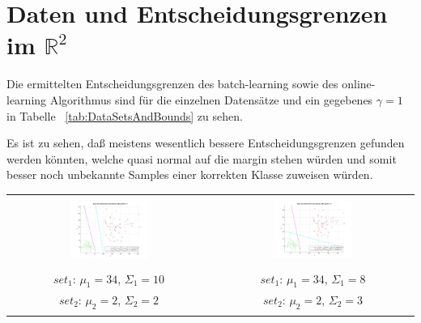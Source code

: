 \documentclass[]{report}
\begin{document}
\section{Daten und Entscheidungsgrenzen im $\mathbb{R}^2$}

Die ermittelten Entscheidungsgrenzen des batch-learning sowie des online-learning Algorithmus sind f\"ur die einzelnen Datens\"atze und ein gegebenes $\gamma=1$ in Tabelle ~\ref{tab:DataSetsAndBounds} zu sehen.

Es ist zu sehen, da{\ss} meistens wesentlich bessere Entscheidungsgrenzen gefunden werden k\"onnten, welche quasi normal auf die margin stehen w\"urden und somit besser noch unbekannte Samples einer korrekten Klasse zuweisen w\"urden.

\begin{table}[h]
\begin{tabular}{| c | c |}
\hline
 & \\
\includegraphics[width=0.4\textwidth]{./images/DataSetAndDecisionBoundary_110.jpg} & \includegraphics[width=0.4\textwidth]{./images/DataSetAndDecisionBoundary_210.jpg} \\
 & \\
 $set_{1}$: $\mu_1=34$, $\Sigma_1=10$ & $set_{1}$: $\mu_1=34$, $\Sigma_1=8$ \\
 $set_{2}$: $\mu_2=2$, $\Sigma_2=2$ & $set_{2}$: $\mu_2=2$, $\Sigma_2=3$ \\
\hline
 & \\

\end{tabular}
\end{table}
\end{document}
